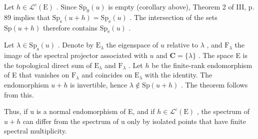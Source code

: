 Let \(h \in \mathcal{L}^c(\mathrm{E})\) . Since \(\mathrm{Sp}_0(u)\) is empty (corollary above), Theorem 2 of III, p. 89 implies that \(\mathrm{Sp_e}(u + h) = \mathrm{Sp_e}(u)\) . The intersection of the sets \(\mathrm{Sp}(u + h)\) therefore contains \(\mathrm{Sp_e}(u)\) .

Let \(\lambda \in \mathrm{Sp}_{\mathrm{s}}(u)\) . Denote by \(\mathrm{E}_{\lambda}\) the eigenspace of \(u\) relative to \(\lambda\) , and \(\mathrm{F}_{\lambda}\) the image of the spectral projector associated with \(u\) and \(\mathbf{C} = \{\lambda\}\) . The space E is the topological direct sum of \(\mathrm{E}_{\lambda}\) and \(\mathrm{F}_{\lambda}\) . Let \(h\) be the finite-rank endomorphism of E that vanishes on \(\mathrm{F}_{\lambda}\) and coincides on \(\mathrm{E}_{\lambda}\) with the identity. The endomorphism \(u + h\) is invertible, hence \(\lambda \notin \mathrm{Sp}(u + h)\) . The theorem follows from this.

Thus, if u is a normal endomorphism of E, and if \(h \in \mathcal{L}^{c}(\mathrm{E})\) , the spectrum of \(u + h\) can differ from the spectrum of u only by isolated points that have finite spectral multiplicity.
\relax{}
